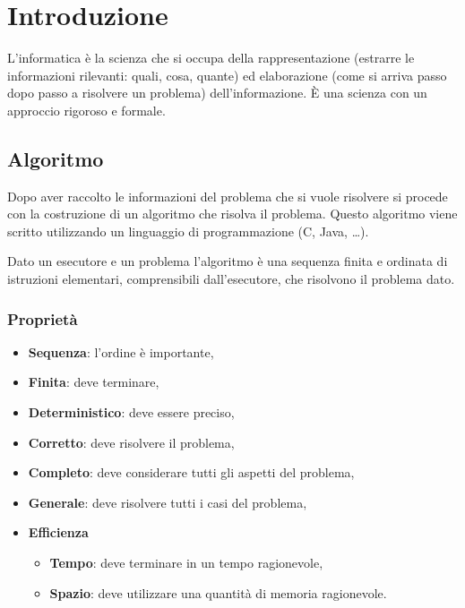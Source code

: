 \documentclass[a4paper]{article}
\theoremstyle{break}
\theoremstyle{break}
\theoremstyle{break}
\theoremstyle{break}
\begin{document}


\tableofcontents
\pagebreak

\section{Introduzione}
L'informatica è la scienza che si occupa della rappresentazione (estrarre
le informazioni rilevanti: quali, cosa, quante) ed elaborazione
(come si arriva passo dopo passo a risolvere un problema) dell'informazione. È una scienza con un approccio rigoroso e formale.

\subsection{Algoritmo}
Dopo aver raccolto le informazioni del problema che si vuole risolvere
si procede con la costruzione di un algoritmo che risolva il problema.
Questo algoritmo viene scritto utilizzando un linguaggio di programmazione
(C, Java, \ldots).

\begin{definition}
	Dato un esecutore e un problema l'algoritmo è una sequenza finita e
	ordinata di istruzioni elementari, comprensibili dall'esecutore,
	che risolvono il problema dato.
\end{definition}

\subsubsection{Proprietà}
\begin{itemize}
	\item \textbf{Sequenza}: l'ordine è importante,
	\item \textbf{Finita}: deve terminare,
	\item \textbf{Deterministico}: deve essere preciso,
	\item \textbf{Corretto}: deve risolvere il problema,
	\item \textbf{Completo}: deve considerare tutti
	      gli aspetti del problema,
	\item \textbf{Generale}: deve risolvere tutti i casi del problema,
	\item \textbf{Efficienza}
	      \begin{itemize}
		      \item \textbf{Tempo}: deve terminare in un tempo ragionevole,
		      \item \textbf{Spazio}: deve utilizzare una quantità di memoria
		            ragionevole.
	      \end{itemize}
\end{itemize}
\end{document}
